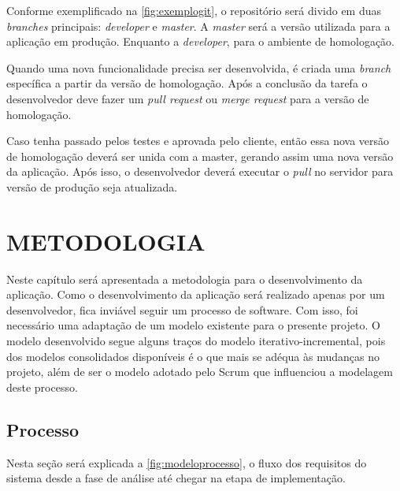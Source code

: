 Conforme exemplificado na \ref{fig:exemplogit}, o repositório será divido em duas \textit{branches} principais: \textit{developer} e \textit{master}. A \textit{master} será a versão utilizada para a aplicação em produção. Enquanto a \textit{developer}, para o ambiente de homologação.

Quando uma nova funcionalidade precisa ser desenvolvida, é criada uma \textit{branch} específica a partir da versão de homologação. Após a conclusão da tarefa o desenvolvedor deve fazer um \textit{pull request} ou \textit{merge request} para a versão de homologação.

Caso tenha passado pelos testes e aprovada pelo cliente, então essa nova versão de homologação deverá ser unida com a master, gerando assim uma nova versão da aplicação. Após isso, o desenvolvedor deverá executar o \textit{pull} no servidor para versão de produção seja atualizada.

\section{METODOLOGIA}
\label{sec:metodologiadev}

Neste capítulo será apresentada a metodologia para o desenvolvimento da aplicação. Como o desenvolvimento da aplicação será realizado apenas por um desenvolvedor, fica inviável seguir um processo de software. Com isso, foi necessário uma adaptação de um modelo existente para o presente projeto. O modelo desenvolvido segue alguns traços do modelo iterativo-incremental, pois dos modelos consolidados disponíveis é o que mais se adéqua às mudanças no projeto, além de ser o modelo adotado pelo Scrum que influenciou a modelagem deste processo.

\subsection{Processo}
\label{sub:processo}
Nesta seção será explicada a \autoref{fig:modeloprocesso}, o fluxo dos requisitos do sistema desde a fase de análise até chegar na etapa de implementação.

